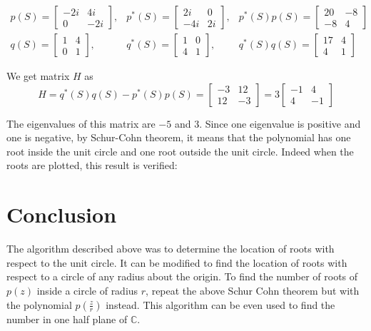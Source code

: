 \documentclass[twofold]{article}
\newcommand*\adj[1]{#1^*}
\theoremstyle{plain}
\theoremstyle{definition}
\theoremstyle{remark}
\begin{document}
 \[\begin{array}{ccc}
 p(S) = \begin{bmatrix} -2i & 4i \\0 &  -2i \end{bmatrix}, & \adj{p}(S) = \begin{bmatrix} 2i & 0 \\-4i  & 2i \end{bmatrix}, &\adj{p}(S) p(S) = \begin{bmatrix} 20 & -8 \\ -8 & 4 \end{bmatrix} \\
 q(S) = \begin{bmatrix} 1 & 4 \\0 & 1 \end{bmatrix}, & \adj{q}(S) =\begin{bmatrix}1 & 0 \\4 & 1 \end{bmatrix}, &\adj{q}(S) q(S) = \begin{bmatrix} 17 & 4 \\ 4 & 1 \end{bmatrix}
\end{array}\]

We get matrix \(H\) as 
\[H = \adj{q}(S) q(S) - \adj{p}(S) p(S) = \begin{bmatrix} -3 & 12 \\ 12 & -3 \end{bmatrix} = 3 \begin{bmatrix} -1 & 4 \\ 4 & -1 \end{bmatrix}\]

The eigenvalues of this matrix are \(-5\) and \(3\). Since one eigenvalue is positive and one is negative, by Schur-Cohn theorem, it means that the polynomial has one root inside the unit circle and one root outside the unit circle. Indeed when the roots are plotted, this result is verified:

\clearpage
\section{Conclusion}

The algorithm described above was to determine the location of roots with respect to the unit circle. It can be modified to find the location of roots with respect to a circle of any radius about the origin. To find the number of roots of \(p(z)\) inside a circle of radius \(r\), repeat the above Schur Cohn theorem but with the polynomial \(p(\frac{z}{r})\) instead. This algorithm can be even used to find the number in one half plane of \(\mathbb{C}\).
\end{document}
